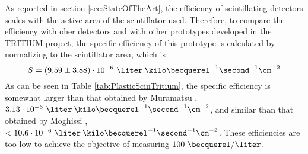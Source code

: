 As reported in section \ref{sec:StateOfTheArt}, the efficiency of scintillating detectors scales with the active area of the scintillator used. Therefore, to compare the efficiency with oher detectors and with other prototypes developed in the TRITIUM project, the specific efficiency of this prototype is calculated by normalizing to the scintillator area, which is 
$$S = (9.59 \pm 3.88)\cdot{} 10^{-6}~\liter\:\kilo\becquerel^{-1}\second^{-1}\cm^{-2}$$
As can be seen in Table \ref{tab:PlasticScinTritium}, the specific efficiency is somewhat larger than that obtained by Muramatsu \cite{Muramatsu}, $3.13 \cdot{} 10^{-6}~\liter\:\kilo\becquerel^{-1}\second^{-1}\cm^{-2}$, and similar than that obtained by Moghissi \cite{Moghissi}, $ <10.6 \cdot{} 10^{-6}~\liter\:\kilo\becquerel^{-1}\second^{-1}\cm^{-2}$. These efficiencies are too low to achieve the objective of measuring $100~\becquerel/\liter$. 












